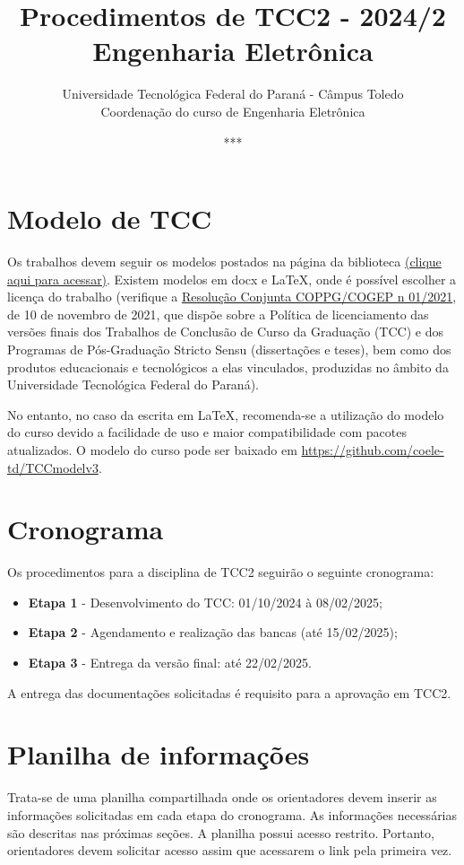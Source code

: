 \documentclass[a4paper, 12pt]{article}
\title{Procedimentos de TCC2 - 2024/2\\\textbf{Engenharia Eletrônica}}
\date{***}
\author{Universidade Tecnológica Federal do Paraná - Câmpus Toledo\\Coordenação do curso de Engenharia Eletrônica}
\newcommand{\startdate}{01/10/2024}		%
\newcommand{\agendadate}{08/02/2025}	%
\newcommand{\bancadate}{15/02/2025}		%
\newcommand{\finaldate}{22/02/2025}		%
\begin{document}
    \maketitle
    
    \section{Modelo de TCC}
    Os trabalhos devem seguir os modelos postados na página da biblioteca \href{http://portal.utfpr.edu.br/biblioteca/trabalhos-academicos}{(clique aqui para acessar)}. Existem modelos em docx e \LaTeX, onde é possível escolher a licença do trabalho (verifique a \href{https://sei.utfpr.edu.br/sei/publicacoes/controlador_publicacoes.php?acao=publicacao_visualizar&id_documento=2615190&id_orgao_publicacao=0}{Resolução Conjunta COPPG/COGEP n\textordmasculine{} 01/2021}, de 10 de novembro de 2021, que dispõe sobre a Política de licenciamento das versões finais dos Trabalhos de Conclusão de Curso da Graduação (TCC) e dos Programas de Pós-Graduação Stricto Sensu (dissertações e teses), bem como dos produtos educacionais e tecnológicos a elas vinculados, produzidas no âmbito da Universidade Tecnológica Federal do Paraná).

	No entanto, no caso da escrita em \LaTeX{}, recomenda-se a utilização do modelo do curso devido a facilidade de uso e maior compatibilidade com pacotes atualizados. O modelo do curso pode ser baixado em \url{https://github.com/coele-td/TCCmodelv3}.
    
    \section{Cronograma}
    \label{sec:CRO}
    
    Os procedimentos para a disciplina de TCC2 seguirão o seguinte cronograma:
    \begin{itemize}
    	\item \textbf{Etapa 1} - Desenvolvimento do TCC: \startdate{} à \agendadate;
    	\item \textbf{Etapa 2} - Agendamento e realização das bancas (até \bancadate);
    	\item \textbf{Etapa 3} - Entrega da versão final: até \finaldate.    	
    \end{itemize}

	A entrega das documentações solicitadas é requisito para a aprovação em TCC2.

	\section{Planilha de informações}
	\label{sec:pla}
	Trata-se de uma planilha compartilhada onde os orientadores  devem inserir as informações solicitadas em cada etapa do cronograma. As informações necessárias são descritas nas próximas seções. A planilha possui acesso restrito. Portanto, orientadores devem solicitar acesso assim que acessarem o link pela primeira vez.
	
\end{document}

